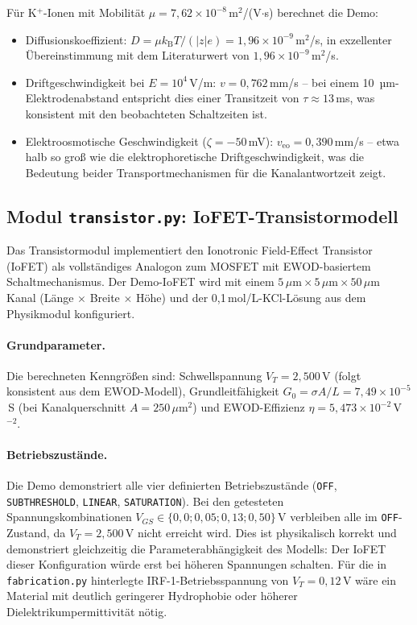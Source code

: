 ﻿\documentclass[a4paper,12pt]{scrreprt}
\theoremstyle{definition}
\begin{document}
Für K$^+$-Ionen mit Mobilität $\mu = 7{,}62 \times 10^{-8}$\,m$^2$/(V$\cdot$s)
berechnet die Demo:
\begin{itemize}
	\item Diffusionskoeffizient: $D = \mu k_\text{B} T / (|z| e) = 1{,}96 \times 10^{-9}$\,m$^2$/s,
	in exzellenter Übereinstimmung mit dem Literaturwert von $1{,}96 \times 10^{-9}$\,m$^2$/s.
	\item Driftgeschwindigkeit bei $E = 10^4$\,V/m: $v = 0{,}762$\,mm/s --
	bei einem 10\, µm-Elektro\-denabstand entspricht dies einer Transitzeit von
	$\tau \approx 13$\,ms, was konsistent mit den beobachteten Schaltzeiten ist.
	\item Elektroosmotische Geschwindigkeit ($\zeta = -50$\,mV): $v_\text{eo} = 0{,}390$\,mm/s --
	etwa halb so groß wie die elektrophoretische Driftgeschwindigkeit,
	was die Bedeutung beider Transportmechanismen für die Kanalantwortzeit zeigt.
\end{itemize}

\subsection{Modul \texttt{transistor.py}: IoFET-Transistormodell}
\label{subsec:demo_transistor}

Das Transistormodul implementiert den Ionotronic Field-Effect Transistor (IoFET)
als vollständiges Analogon zum MOSFET mit EWOD-basiertem Schaltmechanismus.
Der Demo-IoFET wird mit einem $5\,\mu\text{m} \times 5\,\mu\text{m} \times 50\,\mu\text{m}$
Kanal (Länge $\times$ Breite $\times$ Höhe) und der 0,1\,mol/L-KCl-Lösung aus
dem Physikmodul konfiguriert.

\paragraph{Grundparameter.}
Die berechneten Kenngrößen sind:
Schwellspannung $V_T = 2{,}500$\,V (folgt konsistent aus dem EWOD-Modell),
Grundleitfähigkeit $G_0 = \sigma A / L = 7{,}49 \times 10^{-5}$\,S
(bei Kanalquerschnitt $A = 250\,\mu\text{m}^2$) und
EWOD-Effizienz $\eta = 5{,}473 \times 10^{-2}$\,V$^{-2}$.

\paragraph{Betriebszustände.}
Die Demo demonstriert alle vier definierten Betriebszustände
(\texttt{OFF}, \texttt{SUBTHRESHOLD}, \texttt{LINEAR}, \texttt{SATURATION}).
Bei den getesteten Spannungskombinationen $V_{GS} \in \{0{,}0; 0{,}05; 0{,}13; 0{,}50\}$\,V
verbleiben alle im \texttt{OFF}-Zustand, da $V_T = 2{,}500$\,V nicht erreicht
wird. Dies ist physikalisch korrekt und demonstriert gleichzeitig die
Parameterabhängigkeit des Modells: Der IoFET dieser Konfiguration würde erst
bei höheren Spannungen schalten. Für die in \texttt{fabrication.py} hinterlegte
IRF-1-Betriebsspannung von $V_T = 0{,}12$\,V wäre ein Material mit deutlich
geringerer Hydrophobie oder höherer Dielektrikumpermittivität nötig.
\end{document}
